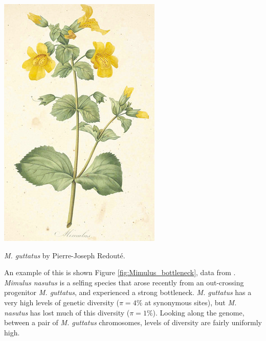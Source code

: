 \begin{marginfigure}[2cm]
\begin{center}
  \includegraphics[width = 0.75 \textwidth]{illustration_images/Genetic_drift/Mimulus/Mimulus.png}
\end{center}
\caption{{\it M. guttatus} by Pierre-Joseph
  Redout\'e.} \label{fig:Human_growth}  %
\end{marginfigure}
An example of this is shown Figure
\ref{fig:Mimulus_bottleneck}, data from \citeauthor{brandvain:14}. {\it Mimulus nasutus} is a selfing
species that arose recently from an out-crossing progenitor {\it M.
  guttatus}, and experienced a strong bottleneck. {\it M. guttatus} has a very high levels of genetic diversity
($\pi=4\%$ at synonymous sites), but {\it M. nasutus} has lost much 
of this diversity ($\pi =1\%$). Looking along the genome, between a
pair of {\it M. guttatus} chromosomes, levels of
diversity are fairly uniformly high.

